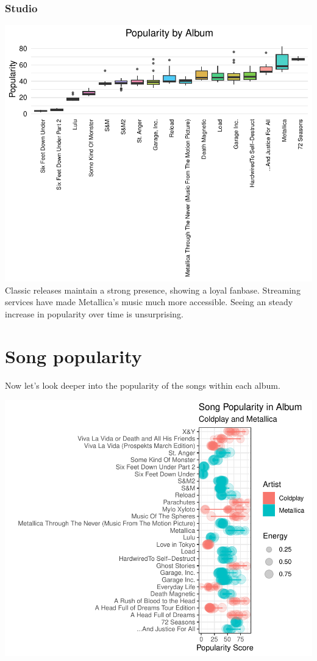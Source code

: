 \documentclass[11pt,preprint]{elsarticle}
\numberwithin{equation}{section}
\numberwithin{figure}{section}
\numberwithin{table}{section}
\begin{document}
\newpage

\subsubsection{Studio}\label{studio}

\includegraphics{Question2_files/figure-latex/unnamed-chunk-4-1.pdf}
Classic releases maintain a strong presence, showing a loyal fanbase.
Streaming services have made Metallica's music much more accessible.
Seeing an steady increase in popularity over time is unsurprising.

\newpage

\section{Song popularity}\label{song-popularity}

Now let's look deeper into the popularity of the songs within each
album.

\begin{center}\includegraphics[width=0.8\linewidth]{Question2_files/figure-latex/unnamed-chunk-5-1} \end{center}
\end{document}
